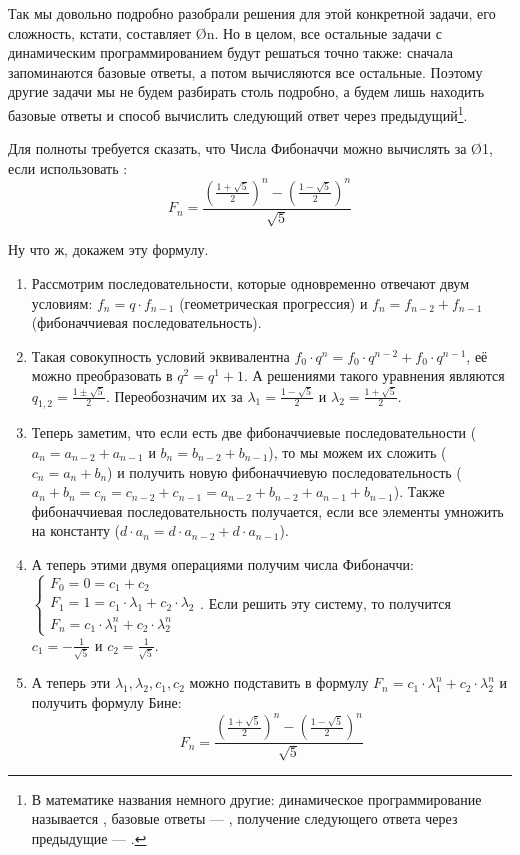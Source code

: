 Так мы довольно подробно разобрали решения для этой конкретной задачи, его сложность, кстати, составляет \O{n}. Но в целом, все остальные задачи с динамическим программированием будут решаться точно также: сначала запоминаются базовые ответы, а потом вычисляются все остальные. Поэтому другие задачи мы не будем разбирать столь подробно, а будем лишь находить базовые ответы и способ вычислить следующий ответ через предыдущий\footnote{В математике названия немного другие: динамическое программирование называется , базовые ответы — , получение следующего ответа через предыдущие — .
}. 

Для полноты требуется сказать, что Числа Фибоначчи можно вычислять за \O{1}, если использовать :
$$ F_n = \frac{ \left(\frac{1 + \sqrt{5}}{2}\right)^n - \left(\frac{1 - \sqrt{5}}{2}\right)^n }{\sqrt{5}} $$

Ну что ж, докажем эту формулу.

\begin{enumerate}
    \item Рассмотрим последовательности, которые одновременно отвечают двум условиям: $f_n = q \cdot f_{n - 1}$ (геометрическая прогрессия) и $f_n = f_{n - 2} + f_{n - 1}$ (фибоначчиевая последовательность).
    \item Такая совокупность условий эквивалентна $f_0 \cdot q^n = f_0 \cdot q^{n - 2} + f_0 \cdot q^{n - 1}$, её можно преобразовать в $q^2 = q^1 + 1$. А решениями такого уравнения являются $q_{1, 2} = \frac{1 \pm \sqrt{5}}{2}$. Переобозначим их за $\lambda_1 = \frac{1 - \sqrt{5}}{2}$ и $\lambda_2 = \frac{1 + \sqrt{5}}{2}$.
    \item Теперь заметим, что если есть две фибоначчиевые последовательности ($a_n = a_{n - 2} + a_{n - 1}$ и $b_n = b_{n - 2} + b_{n - 1}$), то мы можем их сложить ($c_n = a_n + b_n$) и получить новую фибоначчиевую последовательность ($a_n + b_n = c_n = c_{n - 2} + c_{n - 1} = a_{n - 2} + b_{n - 2} + a_{n - 1} + b_{n - 1}$). Также фибоначчиевая последовательность получается, если все элементы умножить на константу ($d \cdot a_n = d \cdot a_{n - 2} + d \cdot a_{n - 1}$).
    \item А теперь этими двумя операциями получим числа Фибоначчи:
        $\begin{cases}
        F_0=0=c_1 + c_2 \\
        F_1=1=c_1 \cdot \lambda_1 + c_2 \cdot \lambda_2 \\
        F_n= c_1 \cdot \lambda_1^n + c_2 \cdot \lambda_2^n
        \end{cases}$.
    Если решить эту систему, то получится $c_1 = -\frac{1}{\sqrt{5}}$ и $c_2 = \frac{1}{\sqrt{5}}$.
    \item А теперь эти $\lambda_1, \lambda_2, c_1, c_2$ можно подставить в формулу $F_n= c_1 \cdot \lambda_1^n + c_2 \cdot \lambda_2^n$ и получить формулу Бине:
    $$ F_n = \frac{ \left(\frac{1 + \sqrt{5}}{2}\right)^n - \left(\frac{1 - \sqrt{5}}{2}\right)^n }{\sqrt{5}} $$
\end{enumerate}


